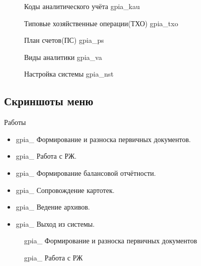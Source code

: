 \begin{figure}[!htb]
    \centering
    \caption{Коды аналитического учёта gpia\_kau}
    \label{fig:gpia_kau}
\end{figure}

\begin{figure}[!htb]
    \centering
    \caption{Типовые хозяйственные операции(ТХО) gpia\_txo}
    \label{fig:gpia_txo}
\end{figure}

\begin{figure}[!htb]
    \centering
    \caption{План счетов(ПС) gpia\_ps}
    \label{fig:gpia_ps}
\end{figure}

\begin{figure}[!htb]
    \centering
    \caption{Виды аналитики gpia\_va}
    \label{fig:gpia_va}
\end{figure}

\begin{figure}[!htb]
    \centering
    \caption{Настройка системы gpia\_nst}
    \label{fig:gpia_nst}
\end{figure}

\newpage

\subsection{Скриншоты меню}

Работы

\begin{itemize}
    \item gpia\_ Формирование и разноска первичных документов.
    \item gpia\_ Работа с РЖ.
    \item gpia\_ Формирование балансовой отчётности.
    \item gpia\_ Сопровождение картотек.
    \item gpia\_ Ведение архивов.
    \item gpia\_ Выход из системы.
\end{itemize}

\begin{figure}[!htb]
    \centering
    \caption{gpia\_ Формирование и разноска первичных документов}
\end{figure}

\begin{figure}[!htb]
    \centering
    \caption{gpia\_ Работа с РЖ}
\end{figure}

